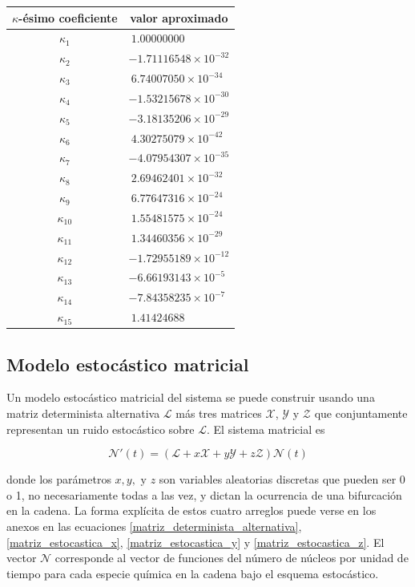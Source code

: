 \begin{center}
\begin{tabular}{|c|l|}
    \hline
    $\kappa$-ésimo coeficiente & \multicolumn{1}{c|}{valor aproximado}\\\hline\hline
    $\kappa_1$ & $\ 1.00000000$ \\
    $\kappa_2$ & $-1.71116548\times 10^{-32}$ \\
    $\kappa_3$ & $\ 6.74007050\times 10^{-34}$ \\
    $\kappa_4$ & $-1.53215678\times 10^{-30}$ \\
    $\kappa_5$ & $-3.18135206\times 10^{-29}$ \\
    $\kappa_6$ & $\ 4.30275079\times 10^{-42}$ \\
    $\kappa_7$ & $-4.07954307\times 10^{-35}$ \\
    $\kappa_8$ & $\ 2.69462401\times 10^{-32}$ \\
    $\kappa_9$ & $\ 6.77647316\times 10^{-24}$ \\
    $\kappa_{10}$ & $\ 1.55481575\times 10^{-24}$ \\
    $\kappa_{11}$ & $\ 1.34460356\times 10^{-29}$ \\
    $\kappa_{12}$ & $-1.72955189\times 10^{-12}$ \\
    $\kappa_{13}$ & $-6.66193143\times 10^{-5}$\\
    $\kappa_{14}$ & $-7.84358235\times 10^{-7}$ \\
    $\kappa_{15}$ & $\ 1.41424688$\\
    \hline
\end{tabular}
\label{tabladecoeficientes2}
\end{center}

\subsection{Modelo estocástico matricial}
Un modelo estocástico matricial del sistema se puede construir usando una matriz determinista alternativa $\mathcal{L}$ más tres matrices $\mathcal{X}$, $\mathcal{Y}$ y $\mathcal{Z}$ que conjuntamente representan un ruido estocástico sobre $\mathcal{L}$. El sistema matricial es

\begin{equation}
	\mathcal{N}'(t)=(\mathcal{L}+x\mathcal{X}+y\mathcal{Y}+z\mathcal{Z})\mathcal{N}(t)
\end{equation}

\noindent donde los parámetros $x, y,\textrm{ y }z$ son variables aleatorias discretas que pueden ser 0 o 1, no necesariamente todas a las vez, y dictan la ocurrencia de una bifurcación en la cadena. La forma explícita de estos cuatro arreglos puede verse en los anexos en las ecuaciones \ref{matriz_determinista_alternativa}, \ref{matriz_estocastica_x}, \ref{matriz_estocastica_y} y \ref{matriz_estocastica_z}. El vector $\mathcal{N}$ corresponde al vector de funciones del número de núcleos por unidad de tiempo para cada especie química en la cadena bajo el esquema estocástico. 